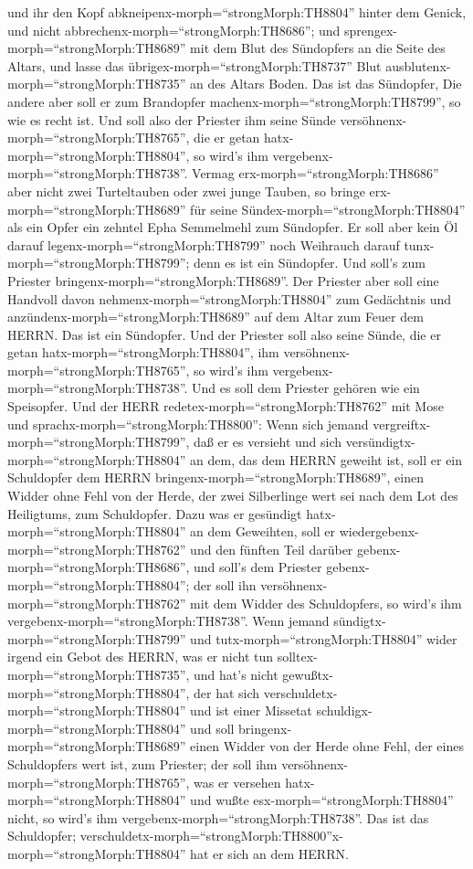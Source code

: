 und ihr den Kopf abkneipenx-morph=``strongMorph:TH8804'' hinter dem
Genick, und nicht abbrechenx-morph=``strongMorph:TH8686''; 
und sprengex-morph=``strongMorph:TH8689'' mit dem Blut des Sündopfers an
die Seite des Altars, und lasse das übrigex-morph=``strongMorph:TH8737''
Blut ausblutenx-morph=``strongMorph:TH8735'' an des Altars Boden. Das
ist das Sündopfer,  Die andere aber soll er zum Brandopfer
machenx-morph=``strongMorph:TH8799'', so wie es recht ist. Und soll also
der Priester ihm seine Sünde versöhnenx-morph=``strongMorph:TH8765'',
die er getan hatx-morph=``strongMorph:TH8804'', so wird's ihm
vergebenx-morph=``strongMorph:TH8738''.  Vermag
erx-morph=``strongMorph:TH8686'' aber nicht zwei Turteltauben oder zwei
junge Tauben, so bringe erx-morph=``strongMorph:TH8689'' für seine
Sündex-morph=``strongMorph:TH8804'' als ein Opfer ein zehntel Epha
Semmelmehl zum Sündopfer. Er soll aber kein Öl darauf
legenx-morph=``strongMorph:TH8799'' noch Weihrauch darauf
tunx-morph=``strongMorph:TH8799''; denn es ist ein Sündopfer.
 Und soll's zum Priester
bringenx-morph=``strongMorph:TH8689''. Der Priester aber soll eine
Handvoll davon nehmenx-morph=``strongMorph:TH8804'' zum Gedächtnis und
anzündenx-morph=``strongMorph:TH8689'' auf dem Altar zum Feuer dem
HERRN. Das ist ein Sündopfer.  Und der Priester soll also
seine Sünde, die er getan hatx-morph=``strongMorph:TH8804'', ihm
versöhnenx-morph=``strongMorph:TH8765'', so wird's ihm
vergebenx-morph=``strongMorph:TH8738''. Und es soll dem Priester gehören
wie ein Speisopfer.  Und der HERR
redetex-morph=``strongMorph:TH8762'' mit Mose und
sprachx-morph=``strongMorph:TH8800'':  Wenn sich jemand
vergreiftx-morph=``strongMorph:TH8799'', daß er es versieht und sich
versündigtx-morph=``strongMorph:TH8804'' an dem, das dem HERRN geweiht
ist, soll er ein Schuldopfer dem HERRN
bringenx-morph=``strongMorph:TH8689'', einen Widder ohne Fehl von der
Herde, der zwei Silberlinge wert sei nach dem Lot des Heiligtums, zum
Schuldopfer.  Dazu was er gesündigt
hatx-morph=``strongMorph:TH8804'' an dem Geweihten, soll er
wiedergebenx-morph=``strongMorph:TH8762'' und den fünften Teil darüber
gebenx-morph=``strongMorph:TH8686'', und soll's dem Priester
gebenx-morph=``strongMorph:TH8804''; der soll ihn
versöhnenx-morph=``strongMorph:TH8762'' mit dem Widder des Schuldopfers,
so wird's ihm vergebenx-morph=``strongMorph:TH8738''.  Wenn
jemand sündigtx-morph=``strongMorph:TH8799'' und
tutx-morph=``strongMorph:TH8804'' wider irgend ein Gebot des HERRN, was
er nicht tun solltex-morph=``strongMorph:TH8735'', und hat's nicht
gewußtx-morph=``strongMorph:TH8804'', der hat sich
verschuldetx-morph=``strongMorph:TH8804'' und ist einer Missetat
schuldigx-morph=``strongMorph:TH8804''  und soll
bringenx-morph=``strongMorph:TH8689'' einen Widder von der Herde ohne
Fehl, der eines Schuldopfers wert ist, zum Priester; der soll ihm
versöhnenx-morph=``strongMorph:TH8765'', was er versehen
hatx-morph=``strongMorph:TH8804'' und wußte
esx-morph=``strongMorph:TH8804'' nicht, so wird's ihm
vergebenx-morph=``strongMorph:TH8738''.  Das ist das
Schuldopfer;
verschuldetx-morph=``strongMorph:TH8800''x-morph=``strongMorph:TH8804''
hat er sich an dem HERRN.

